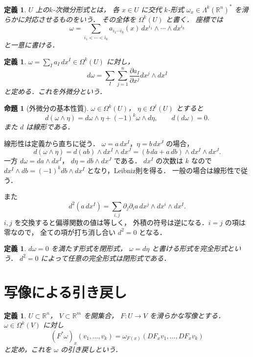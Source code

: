 \documentclass[a5paper,10pt,onecolumn]{jsarticle}
\makeatletter
\theoremstyle{mathnotetheorem}
\newtheorem{definition}[theorem]{定義}
\newtheorem{proposition}[theorem]{命題}
\renewcommand{\proofname}{証明}
\renewenvironment{proof}[1][\proofname]{%
  \par\pushQED{\qed}\normalfont\topsep4\p@\@plus2\p@\relax
  \trivlist\item[\hskip\labelsep\bfseries #1]\ignorespaces
}{\popQED\endtrivlist\@endpefalse}
\makeatother
\begin{document}
\begin{definition}
$U$ 上の\emph{$k$-次微分形式}とは，
各 $x\in U$ に交代 $k$-形式
$\omega_x\in\Lambda^k(\mathbb R^n)^*$ を滑らかに対応させるものをいう．
その全体を $\Omega^k(U)$ と書く．
座標では
\[
 \omega=\sum_{i_1<\cdots<i_k}
 a_{i_1\cdots i_k}(x)\,
 dx^{i_1}\wedge\cdots\wedge dx^{i_k}
\]
と一意に書ける．
\end{definition}

\begin{definition}
$\omega=\sum_I a_I\,dx^I\in\Omega^k(U)$ に対し，
\[
 d\omega=\sum_I\sum_{j=1}^n
 \frac{\partial a_I}{\partial x^j}
 dx^j\wedge dx^I
\]
と定める．これを\emph{外微分}という．
\end{definition}

\begin{proposition}[外微分の基本性質]\label{prop:exterior}
$\omega\in\Omega^k(U)$，
$\eta\in\Omega^\ell(U)$ とすると
\[
 d(\omega\wedge\eta)
 =d\omega\wedge\eta+(-1)^k\omega\wedge d\eta,
 \qquad d(d\omega)=0.
\]
また $d$ は線形である．
\end{proposition}
\begin{proof}
線形性は定義から直ちに従う．
$\omega=a\,dx^I$，$\eta=b\,dx^J$ の場合，
\[
 d(\omega\wedge\eta)
 =d(ab)\wedge dx^I\wedge dx^J
 =(b\,da+a\,db)\wedge dx^I\wedge dx^J.
\]
一方
$d\omega=da\wedge dx^I$，
$d\eta=db\wedge dx^J$ である．
$dx^I$ の次数は $k$ なので
$dx^I\wedge db=(-1)^kdb\wedge dx^I$
となり，Leibniz則を得る．
一般の場合は線形性で従う．

また
\[
 d^2(a\,dx^I)
 =\sum_{i,j}\partial_j\partial_i a\,
 dx^j\wedge dx^i\wedge dx^I.
\]
$i,j$ を交換すると偏導関数の値は等しく，
外積の符号は逆になる．$i=j$ の項は零なので，
全ての項が打ち消し合い $d^2=0$ となる．
\end{proof}

\begin{definition}
$d\omega=0$ を満たす形式を\emph{閉形式}，
$\omega=d\eta$ と書ける形式を\emph{完全形式}という．
$d^2=0$ によって任意の完全形式は閉形式である．
\end{definition}

\section{写像による引き戻し}

\begin{definition}
$U\subset\mathbb R^n$，
$V\subset\mathbb R^m$ を開集合，
$F:U\to V$ を滑らかな写像とする．
$\omega\in\Omega^k(V)$ に対し
\[
 (F^*\omega)_x(v_1,\dots,v_k)
 =\omega_{F(x)}(DF_xv_1,\dots,DF_xv_k)
\]
と定め，これを $\omega$ の\emph{引き戻し}という．
\end{definition}
\end{document}
